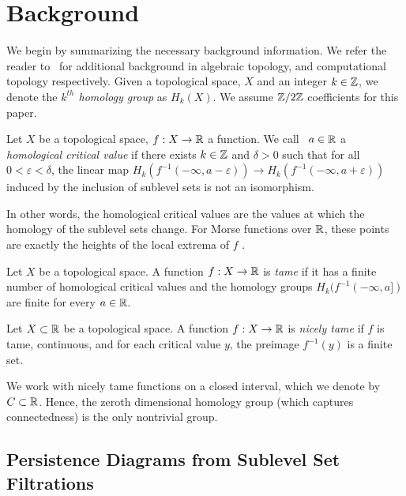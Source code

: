 \section{Background}\label{sec:background}

We begin by summarizing the necessary background information. We refer the reader
to~\cite{HatcherAlgebraic02, EdelsbrunnerComputational10} for additional background in algebraic
topology,  and computational topology respectively. Given a topological space, $X$ and an integer $k \in \mbox{$\mathbb Z$}$, we denote the
\emph{$k^{th}$ homology group} as $H_k(X)$. We assume $\mbox{$\mathbb Z$}/2\mbox{$\mathbb Z$}$ coefficients for this paper.

\begin{defn}
    Let $X$ be a topological space, $f:X \rightarrow \mathbb{R}$ a function. We
    call~ $a\in \mathbb{R}$ a \emph{homological critical value} if there exists $k \in \mbox{$\mathbb Z$}$ and
    $\delta > 0$ such that for all $0 < \varepsilon < \delta$, the linear map
    $H_k(f^{-1}(-\infty, a-\varepsilon)) \rightarrow H_k(f^{-1}(-\infty,
    a+\varepsilon))$ induced by the inclusion of sublevel sets is not an isomorphism.
\end{defn}

In other words, the homological critical values are the values at which the
homology of the sublevel sets change. For Morse functions over $\mathbb{R}$, these points are 
exactly the heights of the local extrema of $f$ \cite{MilnorMorse63}.

\begin{defn}[Tameness]
    Let $X$ be a topological space. A function $f: X \rightarrow
    \mathbb{R}$ is \emph{tame} if it has a finite number of homological critical values
    and the homology groups $H_k(f^{-1}(-\infty, a])$ are finite for every $a
    \in \mathbb{R}$.
\end{defn}

\begin{defn}
    Let $X \subset \mathbb{R}$ be a topological space. A function $f: X \rightarrow \mathbb{R}$
    is \emph{nicely tame} if $f$ is tame, continuous, and for each critical
    value $y$, the preimage $f^{-1}(y)$ is a finite set.
\end{defn}

We work with nicely tame functions on a closed interval, which we denote by
\mbox{$C\subset \mathbb{R}$}.  Hence, the zeroth dimensional homology group (which captures
connectedness) is the only nontrivial group.

\subsection{Persistence Diagrams from Sublevel Set Filtrations}

